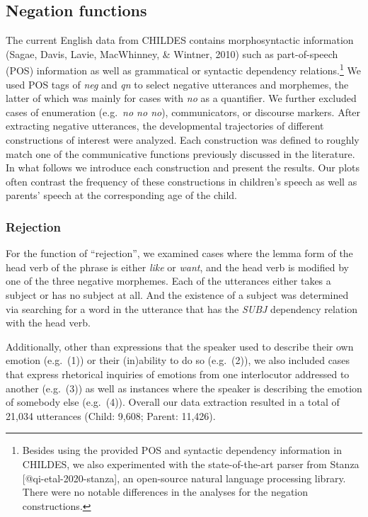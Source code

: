 \documentclass[10pt, letterpaper]{article}
\begin{document}
\hypertarget{negation-functions}{%
\subsection{Negation functions}\label{negation-functions}}

The current English data from CHILDES contains morphosyntactic
information (Sagae, Davis, Lavie, MacWhinney, \& Wintner, 2010) such as
part-of-speech (POS) information as well as grammatical or syntactic
dependency
relations.\footnote{Besides using the provided POS and syntactic dependency information in CHILDES, we also experimented with the state-of-the-art parser from Stanza [@qi-etal-2020-stanza], an open-source natural language processing library. There were no notable differences in the analyses for the negation constructions.}
We used POS tags of \emph{neg} and \emph{qn} to select negative
utterances and morphemes, the latter of which was mainly for cases with
\emph{no} as a quantifier. We further excluded cases of enumeration
(e.g.~\emph{no no no}), communicators, or discourse markers. After
extracting negative utterances, the developmental trajectories of
different constructions of interest were analyzed. Each construction was
defined to roughly match one of the communicative functions previously
discussed in the literature. In what follows we introduce each
construction and present the results. Our plots often contrast the
frequency of these constructions in children's speech as well as
parents' speech at the corresponding age of the child.

\hypertarget{rejection}{%
\subsubsection{Rejection}\label{rejection}}

For the function of ``rejection'', we examined cases where the lemma
form of the head verb of the phrase is either \emph{like} or
\emph{want}, and the head verb is modified by one of the three negative
morphemes. Each of the utterances either takes a subject or has no
subject at all. And the existence of a subject was determined via
searching for a word in the utterance that has the \emph{SUBJ}
dependency relation with the head verb.

Additionally, other than expressions that the speaker used to describe
their own emotion (e.g.~(1)) or their (in)ability to do so (e.g.~(2)),
we also included cases that express rhetorical inquiries of emotions
from one interlocutor addressed to another (e.g.~(3)) as well as
instances where the speaker is describing the emotion of somebody else
(e.g.~(4)). Overall our data extraction resulted in a total of 21,034
utterances (Child: 9,608; Parent: 11,426).
\end{document}
